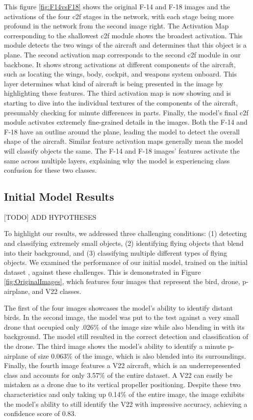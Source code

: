 \documentclass[10pt,twocolumn,letterpaper]{article}
\begin{document}
This figure \ref{fig:F14vsF18} shows the original F-14 and F-18 images and the activations of the four c2f stages in the network, with each stage being more profound in the network from the second image right. The Activation Map corresponding to the shallowest c2f module shows the broadest activation. This module detects the two wings of the aircraft and determines that this object is a plane. The second activation map corresponds to the second c2f module in our backbone. It shows strong activations at different components of the aircraft, such as locating the wings, body, cockpit, and weapons system onboard. This layer determines what kind of aircraft is being presented in the image by highlighting these features. The third activation map is now showing and is starting to dive into the individual textures of the components of the aircraft, presumably checking for minute differences in parts. Finally, the model's final c2f module activates extremely fine-grained details in the images. Both the F-14 and F-18 have an outline around the plane, leading the model to detect the overall shape of the aircraft. Similar feature activation maps generally mean the model will classify objects the same. The F-14 and F-18 images' features activate the same across multiple layers, explaining why the model is experiencing class confusion for these two classes.

\subsection{Initial Model Results}

[TODO] ADD HYPOTHESES

To highlight our results, we addressed three challenging conditions: (1) detecting and classifying extremely small objects, (2) identifying flying objects that blend into their background, and (3) classifying multiple different types of flying objects. We examined the performance of our initial model, trained on the initial dataset \cite{InitialDataset}, against these challenges. This is demonstrated in Figure \ref{fig:OriginalImages}, which features four images that represent the bird, drone, p-airplane, and V22 classes.

The first of the four images showcases the model's ability to identify distant birds. In the second image, the model was put to the test against a very small drone that occupied only .026\% of the image size while also blending in with its background. The model still resulted in the correct detection and classification of the drone. The third image shows the model's ability to identify a minute p-airplane of size 0.063\% of the image, which is also blended into its surroundings. Finally, the fourth image features a V22 aircraft, which is an underrepresented class and accounts for only 3.57\% of the entire dataset. A V22 can easily be mistaken as a drone due to its vertical propeller positioning. Despite these two characteristics and only taking up 0.14\% of the entire image, the image exhibits the model's ability to still identify the V22 with impressive accuracy, achieving a confidence score of 0.83.
\end{document}
